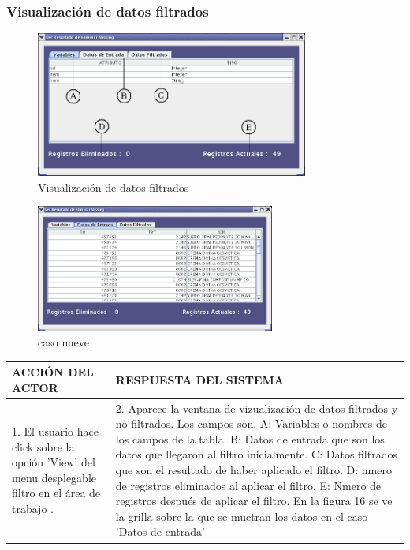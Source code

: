 \subsubsection{Visualizaci\'on de datos filtrados}
\begin{figure}[ht]
\centering
\includegraphics[width=0.8\textwidth]{images/fv1.png}
\caption{Visualizaci\'on de datos filtrados}
\end{figure}
\begin{figure}[ht]
\centering
\includegraphics[width=0.7\textwidth]{images/fv2.png}
\caption{caso nueve}
\end{figure}

\newpage
\begin{center}
\begin{tabular}{|p{60mm}|p{60mm}|} \hline
ACCI\'ON DEL ACTOR & RESPUESTA DEL SISTEMA \\ \hline
1. El usuario hace click sobre la opci\'on 'View' del menu desplegable filtro en el \'area de trabajo . & 2. Aparece la ventana de vizualizaci\'on de datos filtrados y no filtrados. Los campos son, A: Variables o nombres de los campos de la tabla. B: Datos de entrada que son los datos que llegaron al filtro inicialmente.  C: Datos filtrados que son el resultado de haber aplicado el filtro. D: nmero de registros eliminados al aplicar el filtro. E: Nmero de registros despu\'es de aplicar el filtro. En la figura 16 se ve la grilla sobre la que se muetran los datos en el caso 'Datos de entrada'\\ \hline
\end{tabular}
\end{center}


